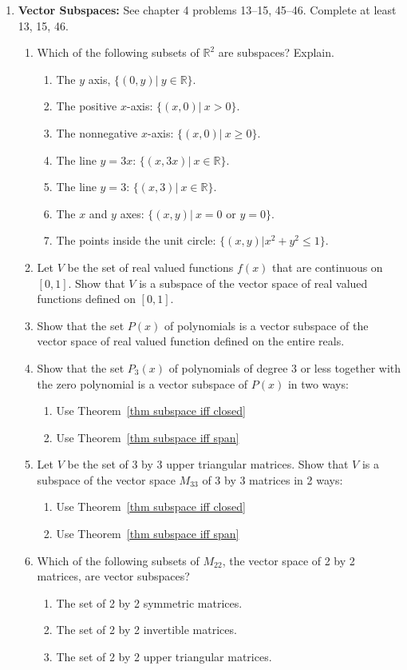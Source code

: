 \begin{enumerate}
\begin{enumerate}
\end{enumerate}

\item \textbf{Vector Subspaces:}  \label{subspace problems}
See chapter 4 problems 13--15, 45--46. Complete at least 13, 15, 46.

\begin{enumerate}
	\item Which of the following subsets of $\mathbb{R}^2$ are subspaces?  Explain.
		\begin{enumerate}
			\item The $y$ axis, $\{(0,y)|\ y\in \mathbb{R}\}$.
			\item The positive $x$-axis: $\{(x,0)|\ x>0\}$.
			\item The nonnegative $x$-axis: $\{(x,0)|\ x\geq 0\}$.
			\item The line $y=3x$: $\{(x,3x)|\ x\in \mathbb{R}\}$.
			\item The line $y=3$: $\{(x,3)|\ x\in \mathbb{R}\}$.
			\item The $x$ and $y$ axes: $\{(x,y)|\ x=0 \text{ or } y=0\}$.
			\item The points inside the unit circle: $\{(x,y)|x^2+y^2\leq 1\}$.
		\end{enumerate}
	\item Let $V$ be the set of real valued functions $f(x)$ that are continuous on $[0,1]$. Show that $V$ is a subspace of the vector space of real valued functions defined on $[0,1]$. 
	\item Show that the set $P(x)$ of polynomials is a vector subspace of the vector space of real valued function defined on the entire reals.
	\item Show that the set $P_3(x)$ of polynomials of degree 3 or less together with the zero polynomial is a vector subspace of $P(x)$ in two ways:
\begin{enumerate}
	\item Use Theorem~\ref{thm subspace iff closed}
	\item Use Theorem~\ref{thm subspace iff span}
\end{enumerate}
	\item Let $V$ be the set of 3 by 3 upper triangular matrices.  Show that $V$ is a subspace of the vector space $M_{33}$ of 3 by 3 matrices in 2 ways:
\begin{enumerate}
	\item Use Theorem~\ref{thm subspace iff closed}
	\item Use Theorem~\ref{thm subspace iff span}
\end{enumerate}
	\item Which of the following subsets of $M_{22}$, the vector space of 2 by 2 matrices, are vector subspaces?
		\begin{enumerate}
			\item The set of 2 by 2 symmetric matrices.
			\item The set of 2 by 2 invertible matrices.
			\item The set of 2 by 2 upper triangular matrices.
		\end{enumerate}


\end{enumerate}
\end{enumerate}
